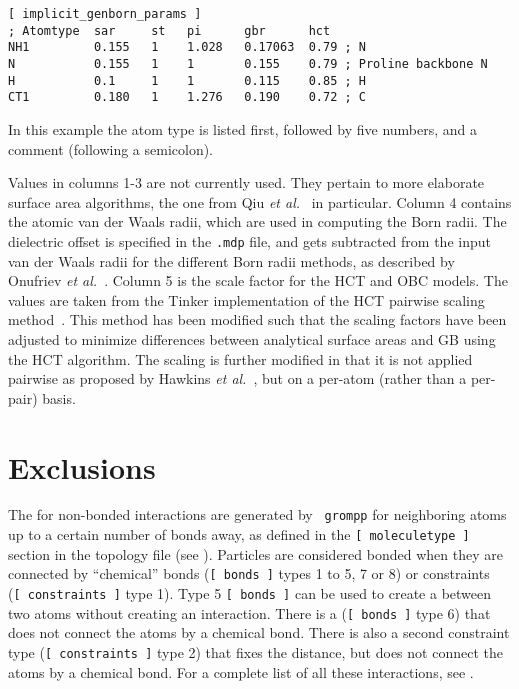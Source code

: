 {\small
\begin{verbatim}
[ implicit_genborn_params ]
; Atomtype  sar     st   pi      gbr      hct
NH1         0.155   1    1.028   0.17063  0.79 ; N
N           0.155   1    1       0.155    0.79 ; Proline backbone N
H           0.1     1    1       0.115    0.85 ; H
CT1         0.180   1    1.276   0.190    0.72 ; C
\end{verbatim}}

In this example the atom type is listed first, followed by five
numbers, and a comment (following a semicolon).

Values in columns 1-3 are not currently used. They pertain to more
elaborate surface area algorithms, the one from Qiu {\em et al.}~\cite{Still97} in
particular.  Column 4 contains the atomic van der Waals radii, which are used
in computing the Born radii. The dielectric offset is specified in
the {\tt *.mdp} file, and gets subtracted from the input van der Waals radii for the different
Born radii methods, as described by Onufriev {\em et al.}~\cite{Case04}.  Column 5 is the 
scale factor for the HCT and OBC models. The values are taken from the Tinker implementation of 
the HCT pairwise scaling method~\cite{Truhlar96}.  This method has been modified such that the
scaling factors have been adjusted to minimize differences between analytical surface areas and
GB using the HCT algorithm.  The scaling is further modified in that it is not applied pairwise
as proposed by Hawkins {\em et al.}~\cite{Truhlar96}, but on a per-atom (rather than a per-pair) 
basis.



\section{Exclusions}
\label{sec:excl}
The  for non-bonded interactions are generated by {\tt
grompp} for neighboring atoms up to a certain number of bonds away, as
defined in the {\tt [~moleculetype~]} section in the topology file
(see ). Particles are considered bonded when they are
connected by ``chemical'' bonds ({\tt [~bonds~]} types 1 to 5, 7 or 8)
or constraints ({\tt [~constraints~]} type 1).
Type 5 {\tt [~bonds~]} can be used to create a 
between two atoms without creating an interaction.
There is a 
({\tt [~bonds~]} type 6) that does not connect the atoms by a chemical bond.
There is also a second constraint type ({\tt [~constraints~]} type 2)
that fixes the distance, but does not connect
the atoms by a chemical bond.
For a complete list of all these interactions, see .

